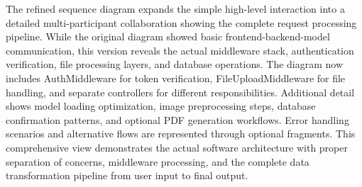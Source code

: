 \begin{enumerate}[label=\roman*.]
          The refined sequence diagram expands the simple high-level interaction into a detailed multi-participant collaboration showing the complete request processing pipeline. While the original diagram showed basic frontend-backend-model communication, this version reveals the actual middleware stack, authentication verification, file processing layers, and database operations. The diagram now includes AuthMiddleware for token verification, FileUploadMiddleware for file handling, and separate controllers for different responsibilities. Additional detail shows model loading optimization, image preprocessing steps, database confirmation patterns, and optional PDF generation workflows. Error handling scenarios and alternative flows are represented through optional fragments. This comprehensive view demonstrates the actual software architecture with proper separation of concerns, middleware processing, and the complete data transformation pipeline from user input to final output.


\end{enumerate}

